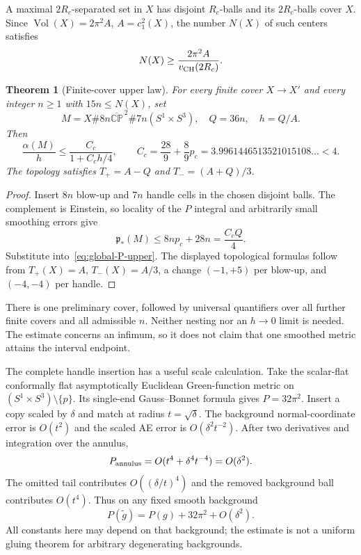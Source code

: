 \documentclass[11pt]{article}
\newcommand{\Vol}{\operatorname{Vol}}
\newcommand{\CP}{\mathbb{CP}}
\newcommand{\pstar}{\mathfrak p_*}
\newtheorem{theorem}{Theorem}[section]
\theoremstyle{definition}
\theoremstyle{remark}
\begin{document}
A maximal $2R_c$-separated set in $X$ has disjoint $R_c$-balls and its
$2R_c$-balls cover $X$. Since $\Vol(X)=2\pi^2A$, $A=c_1^2(X)$, the
number $N(X)$ of such centers satisfies
\begin{equation}
 N(X)\ge\frac{2\pi^2A}{v_{\rm CH}(2R_c)}.
 \label{eq:packing}
\end{equation}

\begin{theorem}[Finite-cover upper law]
\label{thm:cover-law}
For every finite cover $X\to X'$ and every integer $n\ge1$ with
$15n\le N(X)$, set
\[
 M=X\#8n\overline{\CP}^{\,2}\#7n(S^1\times S^3),\quad
 Q=36n,\quad h=Q/A.
\]
Then
\begin{equation}
 \boxed{\frac{\alpha(M)}h\le
  \frac{C_c}{1+C_ch/4},\qquad
 C_c=\frac{28}{9}+\frac89p_c
     =3.9961446513521015108\ldots<4.}
 \label{eq:cover-upper}
\end{equation}
The topology satisfies $T_+=A-Q$ and $T_-=(A+Q)/3$.
\end{theorem}
\begin{proof}
Insert $8n$ blow-up and $7n$ handle cells in the chosen disjoint balls.
The complement is Einstein, so locality of the $P$ integral and arbitrarily
small smoothing errors give
\[
 \pstar(M)\le8np_c+28n=\frac{C_cQ}{4}.
\]
Substitute into~\eqref{eq:global-P-upper}. The displayed topological
formulas follow from $T_+(X)=A$, $T_-(X)=A/3$, a change $(-1,+5)$
per blow-up, and $(-4,-4)$ per handle.
\end{proof}
There is one preliminary cover, followed by universal quantifiers over
all further finite covers and all admissible $n$. Neither nesting nor an
$h\to0$ limit is needed. The estimate concerns an infimum, so it does
not claim that one smoothed metric attains the interval endpoint.

The complete handle insertion has a useful scale calculation. Take the
scalar-flat conformally flat asymptotically Euclidean Green-function
metric on $(S^1\times S^3)\setminus\{p\}$. Its single-end
Gauss--Bonnet formula gives $P=32\pi^2$. Insert a copy scaled by $\delta$
and match at radius $t=\sqrt\delta$. The background normal-coordinate
error is $O(t^2)$ and the scaled AE error is $O(\delta^2t^{-2})$.
After two derivatives and integration over the annulus,
\begin{equation}
 P_{\rm annulus}=O(t^4+\delta^4t^{-4})=O(\delta^2).
 \label{eq:handle-error}
\end{equation}
The omitted tail contributes $O((\delta/t)^4)$ and the removed background
ball contributes $O(t^4)$. Thus on any fixed smooth background
\[
 P(\widetilde g)=P(g)+32\pi^2+O(\delta^2).
\]
All constants here may depend on that background; the estimate is not a
uniform gluing theorem for arbitrary degenerating backgrounds.
\end{document}
